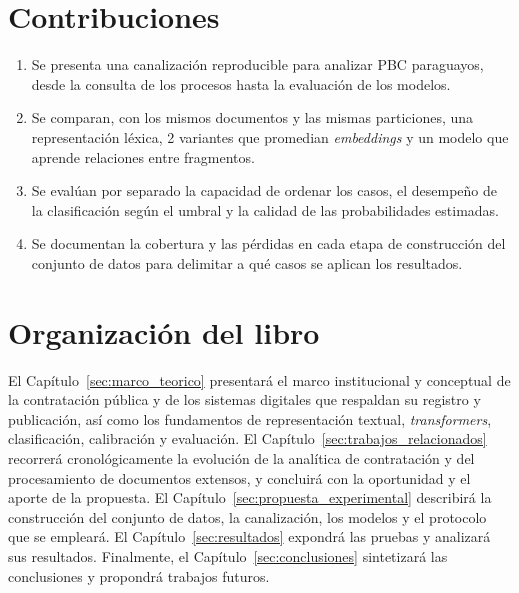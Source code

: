 \section{Contribuciones}

\begin{enumerate}
  \item Se presenta una canalización reproducible para analizar PBC paraguayos, desde la consulta de los procesos hasta la evaluación de los modelos.
  \item Se comparan, con los mismos documentos y las mismas particiones, una representación léxica, 2 variantes que promedian \textit{embeddings} y un modelo que aprende relaciones entre fragmentos.
  \item Se evalúan por separado la capacidad de ordenar los casos, el desempeño de la clasificación según el umbral y la calidad de las probabilidades estimadas.
  \item Se documentan la cobertura y las pérdidas en cada etapa de construcción del conjunto de datos para delimitar a qué casos se aplican los resultados.
\end{enumerate}

\section{Organización del libro}

El Capítulo~\ref{sec:marco_teorico} presentará el marco institucional y conceptual de la contratación pública y de los sistemas digitales que respaldan su registro y publicación, así como los fundamentos de representación textual, \textit{transformers}, clasificación, calibración y evaluación. El Capítulo~\ref{sec:trabajos_relacionados} recorrerá cronológicamente la evolución de la analítica de contratación y del procesamiento de documentos extensos, y concluirá con la oportunidad y el aporte de la propuesta. El Capítulo~\ref{sec:propuesta_experimental} describirá la construcción del conjunto de datos, la canalización, los modelos y el protocolo que se empleará. El Capítulo~\ref{sec:resultados} expondrá las pruebas y analizará sus resultados. Finalmente, el Capítulo~\ref{sec:conclusiones} sintetizará las conclusiones y propondrá trabajos futuros.
